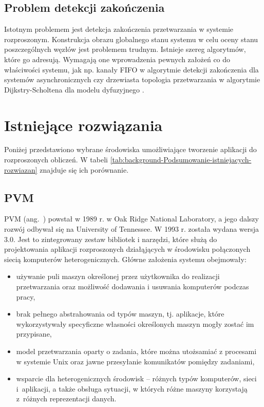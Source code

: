 \subsection{Problem detekcji zakończenia}

\label{sub:background-Problem-detekcji-zakonczenia}Istotnym problemem
jest detekcja zakończenia przetwarzania w systemie rozproszonym. Konstrukcja
obrazu globalnego stanu systemu w celu oceny stanu poszczególnych
węzłów jest problemem trudnym. Istnieje szereg algorytmów, które go
adresują. Wymagają one wprowadzenia pewnych założeń co do właściwości
systemu, jak np. kanały FIFO w algorytmie detekcji zakończenia dla
systemów asynchronicznych \cite{Misra83} czy drzewiasta topologia
przetwarzania w algorytmie Dijkstry-Scholtena dla modelu dyfuzyjnego
\cite{Dijkstra-Diffusing}.


\section{Istniejące rozwiązania}

\label{sec:background-Istniej=000105ce-rozwi=000105zania}Poniżej
przedstawiono wybrane środowiska umożliwiające tworzenie aplikacji
do rozproszonych obliczeń. W tabeli \ref{tab:background-Podsumowanie-istniejacych-rozwiazan}
znajduje się ich porównanie.


\subsection{PVM}

PVM (ang.~) \cite{PVM} powstał
w 1989 r. w Oak Ridge National Laboratory, a jego dalszy rozwój odbywał
się na University of Tennessee. W 1993 r. została wydana wersja 3.0.
Jest to zintegrowany zestaw bibliotek i narzędzi, które służą do projektowania
aplikacji rozproszonych działąjących w środowisku połączonych siecią
komputerów heterogenicznych. Główne założenia systemu obejmowały:
\begin{itemize}
\item używanie puli maszyn określonej przez użytkownika do realizacji przetwarzania
oraz możliwość dodawania i usuwania komputerów podczas pracy,
\item brak pełnego abstrahowania od typów maszyn, tj. aplikacje, które wykorzystywały
specyficzne własności określonych maszyn mogły zostać im przypisane,
\item model przetwarzania oparty o zadania, które można utożsamiać z procesami
w systemie Unix oraz jawne przesyłanie komunikatów pomiędzy zadaniami,
\item wsparcie dla heterogenicznych środowisk -- różnych typów komputerów,
sieci i~aplikacji, a także obsługa sytuacji, w których różne maszyny
korzystają z~różnych reprezentacji danych.
\end{itemize}

